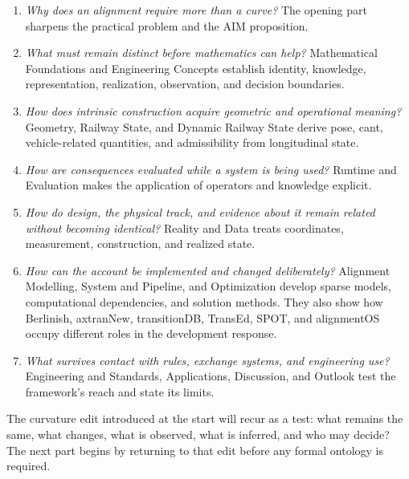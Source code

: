 \begin{enumerate}[leftmargin=*]
\item \emph{Why does an alignment require more than a curve?} The opening part
  sharpens the practical problem and the AIM proposition.
\item \emph{What must remain distinct before mathematics can help?}
  Mathematical Foundations and Engineering Concepts establish identity,
  knowledge, representation, realization, observation, and decision boundaries.
\item \emph{How does intrinsic construction acquire geometric and operational
  meaning?} Geometry, Railway State, and Dynamic Railway State derive pose,
  cant, vehicle-related quantities, and admissibility from longitudinal state.
\item \emph{How are consequences evaluated while a system is being used?}
  Runtime and Evaluation makes the application of operators and knowledge
  explicit.
\item \emph{How do design, the physical track, and evidence about it remain
  related without becoming identical?} Reality and Data treats coordinates,
  measurement, construction, and realized state.
\item \emph{How can the account be implemented and changed deliberately?}
  Alignment Modelling, System and Pipeline, and Optimization develop sparse
  models, computational dependencies, and solution methods. They also show how
  Berlinish, axtranNew, transitionDB, TransEd, SPOT, and alignmentOS occupy
  different roles in the development response.
\item \emph{What survives contact with rules, exchange systems, and engineering
  use?} Engineering and Standards, Applications, Discussion, and Outlook test
  the framework's reach and state its limits.
\end{enumerate}

The curvature edit introduced at the start will recur as a test: what remains
the same, what changes, what is observed, what is inferred, and who may decide?
The next part begins by returning to that edit before any formal ontology is
required.
